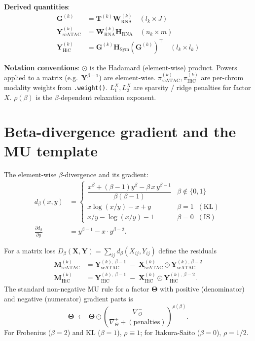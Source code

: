 \documentclass[11pt]{article}
\newcommand{\mat}[1]{\mathbf{#1}}
\newcommand{\Hada}{\odot}
\newcommand{\sci}[1]{\mathrm{#1}}
\begin{document}
\textbf{Derived quantities}:
\begin{align}
\mat{G}^{(k)}              &= \mat{T}^{(k)} \mat{W}_{\sci{RNA}}^{(k)}                                    \quad (l_k \times J) \\
\mat{Y}_{\sci{scATAC}}^{(k)} &= \mat{W}_{\sci{RNA}}^{(k)} \mat{H}_{\sci{RNA}}                              \quad (n_k \times m) \\
\mat{Y}_{\sci{HiC}}^{(k)}   &= \mat{G}^{(k)} \mat{H}_{\sci{Sym}} (\mat{G}^{(k)})^\top                     \quad (l_k \times l_k)
\end{align}

\textbf{Notation conventions}: $\Hada$ is the Hadamard (element-wise) product. Powers applied to a matrix (e.g.\ $\mat{Y}^{\beta-1}$) are element-wise. $\pi_{\sci{scATAC}}^{(k)}, \pi_{\sci{HiC}}^{(k)}$ are per-chrom modality weights from \texttt{.weight()}. $L_1^X, L_2^X$ are sparsity / ridge penalties for factor $X$. $\rho(\beta)$ is the $\beta$-dependent relaxation exponent.

\section{Beta-divergence gradient and the MU template}

The element-wise $\beta$-divergence and its gradient:
\begin{align}
d_\beta(x, y) &= \begin{cases}
  \dfrac{x^\beta + (\beta-1) y^\beta - \beta\, x\, y^{\beta-1}}{\beta(\beta-1)} & \beta \notin \{0, 1\} \\[4pt]
  x \log(x/y) - x + y & \beta = 1 \;\;(\text{KL}) \\[2pt]
  x/y - \log(x/y) - 1 & \beta = 0 \;\;(\text{IS})
\end{cases} \\[6pt]
\frac{\partial d_\beta}{\partial y} &= y^{\beta-1} - x \cdot y^{\beta-2}.
\end{align}

For a matrix loss $D_\beta(\mat{X}, \mat{Y}) = \sum_{ij} d_\beta(X_{ij}, Y_{ij})$ define the residuals
\begin{align}
\mat{M}_{\sci{scATAC}}^{(k)} &= \mat{Y}_{\sci{scATAC}}^{(k),\,\beta-1} \;-\; \mat{X}_{\sci{scATAC}}^{(k)} \Hada \mat{Y}_{\sci{scATAC}}^{(k),\,\beta-2} \\
\mat{M}_{\sci{HiC}}^{(k)}    &= \mat{Y}_{\sci{HiC}}^{(k),\,\beta-1}    \;-\; \mat{X}_{\sci{HiC}}^{(k)}    \Hada \mat{Y}_{\sci{HiC}}^{(k),\,\beta-2}.
\end{align}
The standard non-negative MU rule for a factor $\boldsymbol{\Theta}$ with positive (denominator) and negative (numerator) gradient parts is
\[
\boldsymbol{\Theta} \;\leftarrow\; \boldsymbol{\Theta} \Hada
\left(
\frac{\nabla^{-}_{\Theta}}{\nabla^{+}_{\Theta} + (\text{penalties})}
\right)^{\rho(\beta)}.
\]
For Frobenius ($\beta=2$) and KL ($\beta=1$), $\rho \equiv 1$; for Itakura-Saito ($\beta=0$), $\rho = 1/2$.
\end{document}
